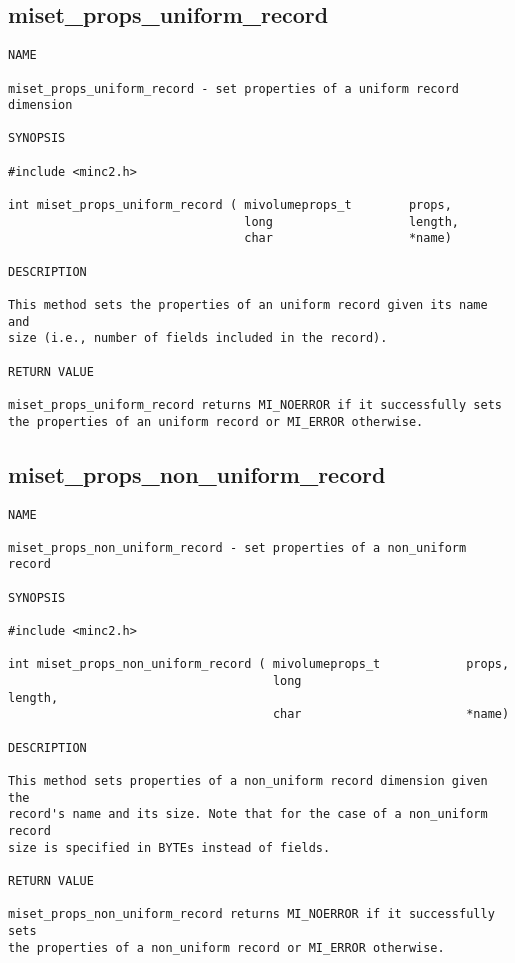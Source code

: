\documentclass{article}
\begin{document}
\subsection{miset\_props\_uniform\_record}
\begin{verbatim}
NAME

miset_props_uniform_record - set properties of a uniform record dimension

SYNOPSIS

#include <minc2.h>

int miset_props_uniform_record ( mivolumeprops_t        props,
                                 long                   length,
                                 char                   *name)

DESCRIPTION

This method sets the properties of an uniform record given its name and
size (i.e., number of fields included in the record).

RETURN VALUE

miset_props_uniform_record returns MI_NOERROR if it successfully sets
the properties of an uniform record or MI_ERROR otherwise.
\end{verbatim}

\subsection{miset\_props\_non\_uniform\_record}
\begin{verbatim}
NAME

miset_props_non_uniform_record - set properties of a non_uniform record

SYNOPSIS

#include <minc2.h>

int miset_props_non_uniform_record ( mivolumeprops_t            props,
                                     long                       length,
                                     char                       *name)

DESCRIPTION

This method sets properties of a non_uniform record dimension given the 
record's name and its size. Note that for the case of a non_uniform record
size is specified in BYTEs instead of fields.

RETURN VALUE

miset_props_non_uniform_record returns MI_NOERROR if it successfully sets
the properties of a non_uniform record or MI_ERROR otherwise.
\end{verbatim}
\end{document}
